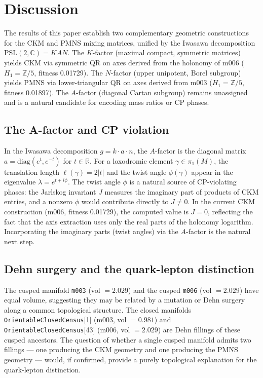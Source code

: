 \documentclass[epjc3]{svjour3}
\newcommand{\PSL}{\mathrm{PSL}(2,\mathbb{C})}
\begin{document}
\section{Discussion}
\label{sec:discussion}

The results of this paper establish two complementary geometric
constructions for the CKM and PMNS mixing matrices, unified by the
Iwasawa decomposition $\PSL = KAN$.
The $K$-factor (maximal compact, symmetric matrices) yields CKM
via symmetric QR on axes derived from the holonomy of m006
($H_1 = \mathbb{Z}/5$, fitness 0.01729).
The $N$-factor (upper unipotent, Borel subgroup) yields PMNS
via lower-triangular QR on axes derived from m003
($H_1 = \mathbb{Z}/5$, fitness 0.01897).
The $A$-factor (diagonal Cartan subgroup) remains unassigned and
is a natural candidate for encoding mass ratios or CP phases.

\subsection{The A-factor and CP violation}

In the Iwasawa decomposition $g = k \cdot a \cdot n$, the $A$-factor
is the diagonal matrix $a = \mathrm{diag}(e^t, e^{-t})$ for $t \in \mathbb{R}$.
For a loxodromic element $\gamma \in \pi_1(M)$, the translation
length $\ell(\gamma) = 2|t|$ and the twist angle $\phi(\gamma)$
appear in the eigenvalue $\lambda = e^{t + i\phi}$.
The twist angle $\phi$ is a natural source of CP-violating phases:
the Jarlskog invariant $J$ measures the imaginary part of products
of CKM entries, and a nonzero $\phi$ would contribute directly
to $J \neq 0$.
In the current CKM construction (m006, fitness 0.01729), the
computed value is $J = 0$, reflecting the fact that the axis
extraction uses only the real parts of the holonomy logarithm.
Incorporating the imaginary parts (twist angles) via the $A$-factor
is the natural next step.

\subsection{Dehn surgery and the quark-lepton distinction}

The cusped manifold \texttt{m003} (vol $= 2.029$) and the cusped
\texttt{m006} (vol $= 2.029$) have equal volume, suggesting they
may be related by a mutation or Dehn surgery along a common
topological structure. The closed manifolds
\texttt{OrientableClosedCensus}[1] (m003, vol $= 0.981$) and
\texttt{OrientableClosedCensus}[43] (m006, vol $= 2.029$) are
Dehn fillings of these cusped ancestors.
The question of whether a single cusped manifold admits two fillings
--- one producing the CKM geometry and one producing the PMNS
geometry --- would, if confirmed, provide a purely topological
explanation for the quark-lepton distinction.
\end{document}
